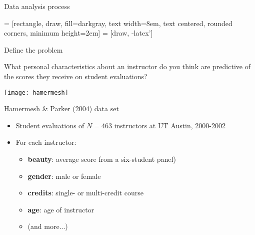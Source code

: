 \documentclass{beamer}\usepackage[]{graphicx}\usepackage[]{color}
\begin{document}
\begin{darkframes}
    \begin{frame}{Data analysis process}
      \begin{center}
         = [rectangle, draw, fill=darkgray, 
            text width=8em, text centered, rounded corners, minimum height=2em]
         = [draw, -latex']

      \end{center}
    \end{frame}

    \begin{frame}{Define the problem}
      \begin{center}
        What personal characteristics about an instructor do you think are predictive of the scores they receive on student evaluations?
      \end{center}
    \end{frame}

    \begin{frame}
      \texttt{[image: hamermesh]}
    \end{frame}

    \begin{frame}{Hamermesh \& Parker (2004) data set}
      \begin{itemize}
        \item Student evaluations of $N=463$ instructors at UT Austin, 2000-2002
        \item For each instructor:
          \begin{itemize}
            \item \textbf{beauty}: average score from a six-student panel)
            \item \textbf{gender}: male or female
            \item \textbf{credits}: single- or multi-credit course
            \item \textbf{age}: age of instructor
            \item (and more...)
          \end{itemize}
      \end{itemize}
    \end{frame}


\end{darkframes}
\end{document}
